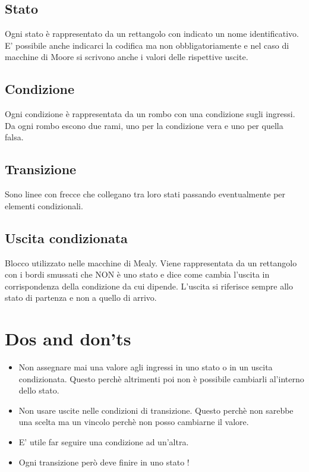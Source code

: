 \documentclass[a4paper]{book}
\begin{document}
\subsection*{Stato}

Ogni stato è rappresentato da un rettangolo con indicato un nome identificativo.
E' possibile anche indicarci la codifica ma non obbligatoriamente e nel caso di macchine di Moore si scrivono anche i valori delle rispettive uscite.


\subsection*{Condizione}

Ogni condizione è rappresentata da un rombo con una condizione sugli ingressi.
Da ogni rombo escono due rami, uno per la condizione vera e uno per quella falsa.



\subsection*{Transizione}

Sono linee con frecce che collegano tra loro stati passando eventualmente per elementi condizionali.

\subsection*{Uscita condizionata}

Blocco utilizzato nelle macchine di Mealy.
Viene rappresentata da un rettangolo con i bordi smussati che NON è uno stato e dice come cambia l'uscita in corrispondenza della  condizione da cui dipende.
L'uscita si riferisce sempre allo stato di partenza e non a quello di arrivo.
\section{Dos and don'ts}

\begin{itemize}
\item Non assegnare mai una valore agli ingressi in uno stato o in un uscita condizionata. Questo perchè altrimenti poi non è possibile cambiarli al'interno dello stato.
\item Non usare uscite nelle condizioni di transizione. Questo perchè non sarebbe una scelta ma un vincolo perchè non posso cambiarne il valore.
\item E' utile far seguire una condizione ad un'altra.
\item Ogni transizione però deve finire in uno stato !
\end{itemize}
\end{document}
